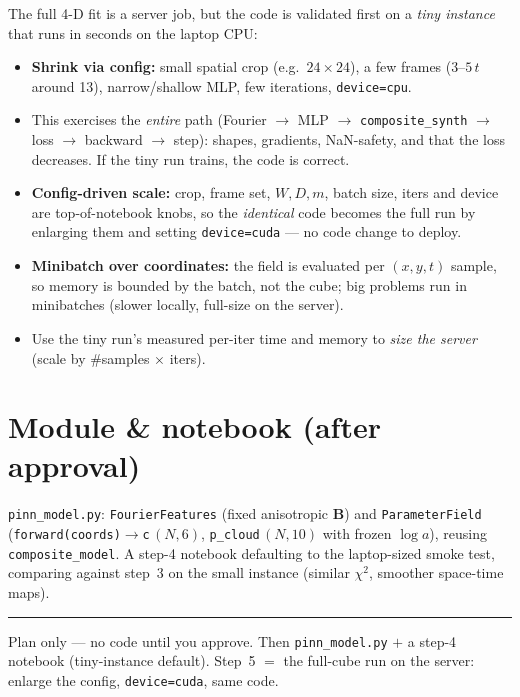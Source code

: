 \documentclass[10pt,a4paper]{article}
\newcommand{\co}[1]{{\small\texttt{#1}}}
\begin{document}
The full 4-D fit is a server job, but the code is validated first on a \emph{tiny instance} that runs in seconds on the laptop CPU:
\begin{itemize}
\item \textbf{Shrink via config:} small spatial crop (e.g.\ $24\times24$), a few frames ($3$--$5\,t$ around 13), narrow/shallow MLP, few iterations, \co{device=cpu}.
\item This exercises the \emph{entire} path (Fourier $\rightarrow$ MLP $\rightarrow$ \co{composite\_synth} $\rightarrow$ loss $\rightarrow$ backward $\rightarrow$ step): shapes, gradients, NaN-safety, and that the loss decreases. If the tiny run trains, the code is correct.
\item \textbf{Config-driven scale:} crop, frame set, $W,D,m$, batch size, iters and device are top-of-notebook knobs, so the \emph{identical} code becomes the full run by enlarging them and setting \co{device=cuda} --- no code change to deploy.
\item \textbf{Minibatch over coordinates:} the field is evaluated per $(x,y,t)$ sample, so memory is bounded by the batch, not the cube; big problems run in minibatches (slower locally, full-size on the server).
\item Use the tiny run's measured per-iter time and memory to \emph{size the server} (scale by \#samples $\times$ iters).
\end{itemize}

\section{Module \& notebook (after approval)}

\co{pinn\_model.py}: \co{FourierFeatures} (fixed anisotropic $\mathbf B$) and \co{ParameterField} (\co{forward(coords)}$\rightarrow$\co{c}\,$(N,6)$, \co{p\_cloud}\,$(N,10)$ with frozen $\log a$), reusing \co{composite\_model}. A step-4 notebook defaulting to the laptop-sized smoke test, comparing against step~3 on the small instance (similar $\chi^2$, smoother space-time maps).

\vspace{1pt}
{\footnotesize\color{gry}\rule{\textwidth}{0.4pt}}
{\sffamily\color{gry}\footnotesize Plan only --- no code until you approve. Then \co{pinn\_model.py} $+$ a step-4 notebook (tiny-instance default). Step~5 $=$ the full-cube run on the server: enlarge the config, \co{device=cuda}, same code.}
\end{document}
